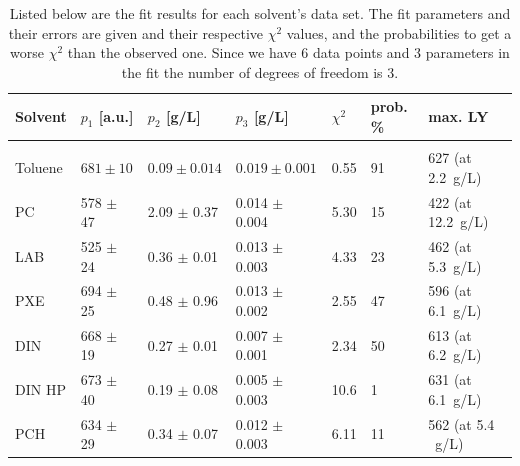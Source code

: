 \documentclass{JINST}
\begin{document}
\begin{table}
\caption{Listed below are the fit results for each solvent's data set. The fit parameters and their errors are given and their respective $\chi^{2}$ values, and the probabilities to get a worse $\chi^{2}$ than the observed one. Since we have 6 data points and 3 parameters in the fit the number of degrees of freedom is 3. \label{fitresult_table}}

  \begin{center}
    \begin{tabular}{lllllll}
       Solvent & $p_1$ [a.u.] & $p_2$ [g/L] & $p_3$ [g/L] & $\chi^{2}$ & prob. \% & max. LY\\
       \hline\hline\\[-5px]
       Toluene  & $681 \pm 10$  & $0.09 \pm 0.014$  & $0.019 \pm 0.001$ & 0.55 & 91 & 627 (at 2.2~g/L)\\
       PC & 578 $\pm$ 47  & 2.09 $\pm$ 0.37  & 0.014 $\pm$ 0.004  & 5.30  & 15  & 422 (at 12.2~g/L)\\
       LAB & 525 $\pm$ 24  & 0.36 $\pm$ 0.01  & 0.013 $\pm$ 0.003  & 4.33  & 23 & 462 (at 5.3~g/L)\\
       PXE & 694 $\pm$ 25  & 0.48 $\pm$ 0.96  & 0.013 $\pm$ 0.002 & 2.55  & 47 & 596 (at 6.1~g/L) \\
       DIN & 668 $\pm$ 19  & 0.27 $\pm$ 0.01  & 0.007 $\pm$ 0.001  & 2.34  & 50 & 613 (at 6.2~g/L)  \\
       DIN HP & 673 $\pm$ 40 & 0.19 $\pm$ 0.08 & 0.005 $\pm$ 0.003  & 10.6  & 1 & 631 (at 6.1~g/L) \\
       PCH & 634 $\pm$ 29  & 0.34 $\pm$ 0.07  & 0.012 $\pm$ 0.003 & 6.11  & 11 & 562 (at 5.4 ~g/L) \\
      \hline \hline
    \end{tabular}
  \end{center}
\end{table}
\end{document}
